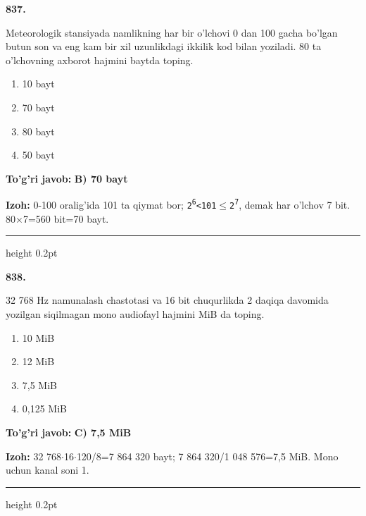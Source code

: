 \documentclass[10pt,a4paper,oneside]{article}
\begin{document}
\noindent\textbf{\color{ink}837.}
\par
Meteorologik stansiyada namlikning har bir o'lchovi 0 dan 100 gacha bo'lgan butun son va eng kam bir xil uzunlikdagi ikkilik kod bilan yoziladi. 80 ta o'lchovning axborot hajmini baytda toping.
\begin{enumerate}[label=\Alph*),leftmargin=9mm]
\item 10 bayt
\item 70 bayt
\item 80 bayt
\item 50 bayt
\end{enumerate}
\begin{tcolorbox}[enhanced,breakable,colback=teal!4,colframe=teal!50!black,boxrule=0.5pt,arc=1.1mm,left=3mm,right=3mm,top=1.7mm,bottom=1.7mm,before skip=2mm,after skip=2mm]
\textbf{\color{teal}To'g'ri javob:} \textbf{B) 70 bayt}
\par\smallskip
\textbf{Izoh:} 0-100 oralig'ida 101 ta qiymat bor; \texttt{2\textsuperscript{6}\textless{}101\ensuremath{\leq}2\textsuperscript{7}}, demak har o'lchov 7 bit. 80\ensuremath{\times}7=560 bit=70 bayt.
\end{tcolorbox}
\vspace{2mm}\hrule height 0.2pt \vspace{3mm}

\noindent\textbf{\color{ink}838.}
\par
32 768 Hz namunalash chastotasi va 16 bit chuqurlikda 2 daqiqa davomida yozilgan siqilmagan mono audiofayl hajmini MiB da toping.
\begin{enumerate}[label=\Alph*),leftmargin=9mm]
\item 10 MiB
\item 12 MiB
\item 7,5 MiB
\item 0,125 MiB
\end{enumerate}
\begin{tcolorbox}[enhanced,breakable,colback=teal!4,colframe=teal!50!black,boxrule=0.5pt,arc=1.1mm,left=3mm,right=3mm,top=1.7mm,bottom=1.7mm,before skip=2mm,after skip=2mm]
\textbf{\color{teal}To'g'ri javob:} \textbf{C) 7,5 MiB}
\par\smallskip
\textbf{Izoh:} 32 768\ensuremath{\cdot}16\ensuremath{\cdot}120/8=7 864 320 bayt; 7 864 320/1 048 576=7,5 MiB. Mono uchun kanal soni 1.
\end{tcolorbox}
\vspace{2mm}\hrule height 0.2pt \vspace{3mm}
\end{document}
